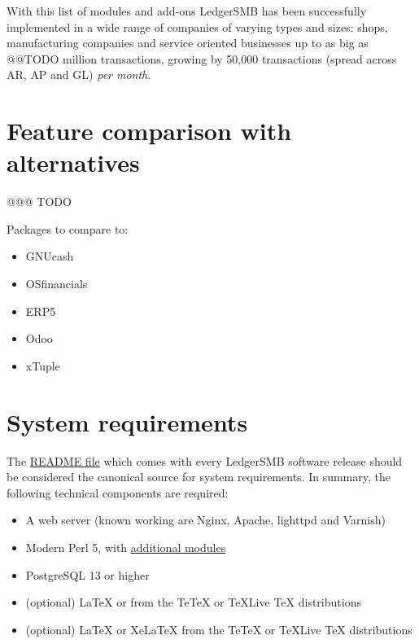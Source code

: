 With this list of modules and \glspl{add-on} LedgerSMB has been successfully
implemented in a wide range of companies of varying types and sizes: shops,
manufacturing companies and service oriented businesses up to as big as @@TODO million transactions, growing by 50,000 transactions (spread across \acrshort{AR}, \acrshort{AP} and \acrshort{GL}) \emph{per month}.

\section{Feature comparison with alternatives}
\label{sec-ledgersmb-feature-comparison}
@@@ TODO

Packages to compare to:

\begin{itemize}
	\item GNUcash
	\item OSfinancials
	\item ERP5
	\item Odoo
	\item xTuple
\end{itemize}



\section{System requirements}
\label{sec-ledgersmb-system-requirements}

The \href{https://github.com/ledgersmb/LedgerSMB/blob/1.10/README.md#system-requirements}{README file}
which comes with every LedgerSMB software release should be
considered the canonical source for system requirements. In summary, the
following technical components are required:

\begin{itemize}
	\item A web server (known working are Nginx, Apache, lighttpd and Varnish)
	\item Modern Perl 5, with \href{https://github.com/ledgersmb/LedgerSMB/blob/1.10/cpanfile}{additional modules}
	\item PostgreSQL 13 or higher
    \ifpdf
	   \item (optional) \LaTeX{} or \XeLaTeX{} from the Te\TeX{} or \TeX{}Live \TeX{} distributions
    \else
    	\item (optional) LaTeX or XeLaTeX from the TeTeX or TeXLive TeX distributions
    \fi
    
\end{itemize}

